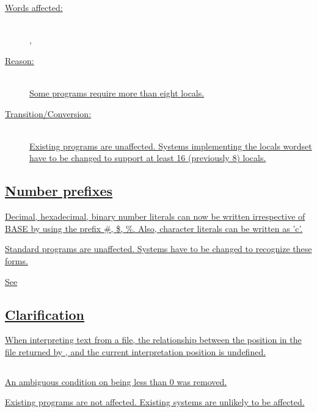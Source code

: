 \begin{description}
\item[\uline{Words affected:}] ~\\
	\uline{, }

\item[\uline{Reason:}] ~\\
	\uline{Some programs require more than eight locals.}
 
\item[\uline{Transition/Conversion:}] ~\\
	\uline{Existing programs are unaffected.  Systems implementing the locals
	wordset have to be changed to support at least 16 (previously 8) locals.}
\end{description}

\subsection[Number prefixes]{\uline{Number prefixes}} %
 \label{diff:12:prefix}

\uline{Decimal, hexadecimal, binary number literals can now be written
irrespective of BASE by using the prefix \#, \$, \%.  Also, character
literals can be written as 'c'.}
 
\uline{Standard programs are unaffected.  Systems have to be changed to
recognize these forms.}

\uline{See} 
 

\subsection[SOURCE-ID Clarification]{\uline{ Clarification}} %
\label{diff:12:sourceid}

\uline{%
When interpreting text from a file, the relationship between the position in the
file returned by , and the current interpretation position is
undefined.}


\subsection[FASINH]{\uline{}} %
 \label{diff:12:fasinh}

\uline{An ambiguous condition on  being less than 0 was removed.}

\uline{Existing programs are not affected.  Existing systems are
unlikely to be affected.}

